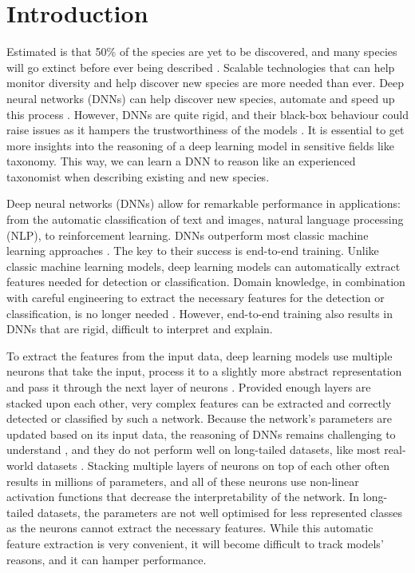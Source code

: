 \documentclass[a4paper, 12pt, oneside]{book} %
\begin{document}
\section{Introduction}
Estimated is that 50\% of the species are yet to be discovered, and many species will go extinct before ever being described \autocite{lees_species_2015}.
Scalable technologies that can help monitor diversity and help discover new species are more needed than ever.
Deep neural networks (DNNs) can help discover new species, automate and speed up this process \autocite{van_horn_inaturalist_2018}.
However, DNNs are quite rigid, and their black-box behaviour could raise issues as it hampers the trustworthiness of the models \autocite{carvalho_machine_2019}.
It is essential to get more insights into the reasoning of a deep learning model in sensitive fields like taxonomy.
This way, we can learn a DNN to reason like an experienced taxonomist when describing existing and new species.

Deep neural networks (DNNs) allow for remarkable performance in applications: from the automatic classification of text and images, natural language processing (NLP), to reinforcement learning.
DNNs outperform most classic machine learning approaches \autocite{he_delving_2015, brown_language_2020}.
The key to their success is end-to-end training.
Unlike classic machine learning models, deep learning models can automatically extract features needed for detection or classification.
Domain knowledge, in combination with careful engineering to extract the necessary features for the detection or classification, is no longer needed \autocite{lecun_deep_2015}.
However, end-to-end training also results in DNNs that are rigid, difficult to interpret and explain.

To extract the features from the input data, deep learning models use multiple neurons that take the input, process it to a slightly more abstract representation and pass it through the next layer of neurons \autocite{schmidhuber_deep_2015}.
Provided enough layers are stacked upon each other, very complex features can be extracted and correctly detected or classified by such a network.
Because the network's parameters are updated based on its input data, the reasoning of DNNs remains challenging to understand \autocite{li_interpretable_2021, losch_interpretability_2019}, and they do not perform well on long-tailed datasets, like most real-world datasets \autocite{van_horn_inaturalist_2018}.
Stacking multiple layers of neurons on top of each other often results in millions of parameters, and all of these neurons use non-linear activation functions that decrease the interpretability of the network.
In long-tailed datasets, the parameters are not well optimised for less represented classes as the neurons cannot extract the necessary features.
While this automatic feature extraction is very convenient, it will become difficult to track models' reasons, and it can hamper performance.
\end{document}
